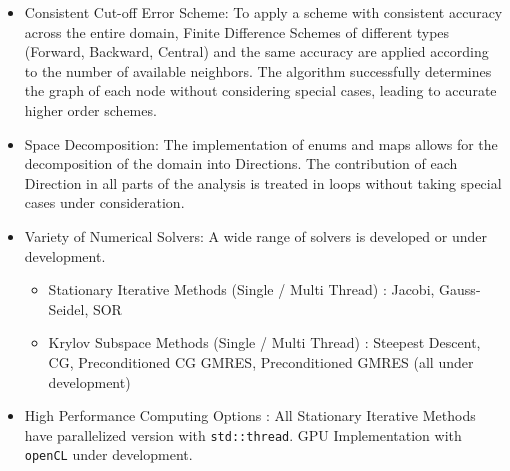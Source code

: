 \documentclass{article}
\begin{document}
\begin{itemize}
		\item Consistent Cut-off Error Scheme: To apply a scheme with consistent accuracy across the entire domain, Finite Difference Schemes of different types (Forward, Backward, Central) and the same accuracy are applied according to the number of available neighbors. The algorithm successfully determines the graph of each node without considering special cases, leading to accurate higher order schemes.
		
		\item Space Decomposition: The implementation of enums and maps allows for the decomposition of the domain into Directions. The contribution of each Direction in all parts of the analysis is treated in loops without taking special cases under consideration.
		
		\item Variety of Numerical Solvers: A wide range of solvers is developed or under development.
		\begin{itemize}
			\item Stationary Iterative Methods (Single / Multi Thread) : Jacobi, Gauss-Seidel, SOR
			\item Krylov Subspace Methods (Single / Multi Thread) : Steepest Descent, CG, Preconditioned CG GMRES, Preconditioned GMRES (all under development)
		\end{itemize}
	
		\item {High Performance Computing Options} : All Stationary Iterative Methods have parallelized version with \texttt{std::thread}. GPU Implementation with \texttt{openCL} under development. 
	\end{itemize}
\end{document}
